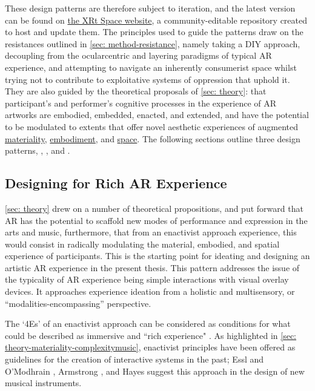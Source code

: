 These design patterns are therefore subject to iteration, and the latest version can be found on \href{https://www.thexrt.space}{the XRt Space website}, a community-editable repository created to host and update them. The principles used to guide the patterns draw on the resistances outlined in \autoref{sec: method-resistance}, namely taking a DIY approach, decoupling from the ocularcentric and layering paradigms of typical AR experience, and attempting to navigate an inherently consumerist space whilst trying not to contribute to exploitative systems of oppression that uphold it. They are also guided by the theoretical proposals of \autoref{sec: theory}: that participant's and performer's cognitive processes in the experience of AR artworks are embodied, embedded, enacted, and extended, and have the potential to be modulated to extents that offer novel aesthetic experiences of augmented \hyperref[sec: theory-materiality]{materiality}, \hyperref[sec: theory-embodiment]{embodiment}, and \hyperref[sec: theory-space]{space}. The following sections outline three design patterns, \textit{}, \textit{}, and \textit{}.

\subsection{Designing for Rich AR Experience} \label{sec: method-patterns-experience} 
\autoref{sec: theory} drew on a number of theoretical propositions, and put forward that AR has the potential to scaffold new modes of performance and expression in the arts and music, furthermore, that from an enactivist approach experience, this would consist in radically modulating the material, embodied, and spatial experience of participants. This is the starting point for ideating and designing an artistic AR experience in the present thesis. This pattern addresses the issue of the typicality of AR experience being simple interactions with visual overlay devices. It approaches experience ideation from a holistic and multisensory, or ``modalities-encompassing'' \citep{schraffenberger2018} perspective.

The `4Es' of an enactivist approach can be considered as conditions for what could be described as immersive and ``rich experience" \citep{bilbow2021}. As highlighted in \autoref{sec: theory-materiality-complexitymusic}, enactivist principles have been offered as guidelines for the creation of interactive systems in the past; Essl and O'Modhrain \citeyearpar{essl2006}, Armstrong \citeyearpar{armstrong2006}, and Hayes \citeyearpar{hayes2019} suggest this approach in the design of new musical instruments. 

